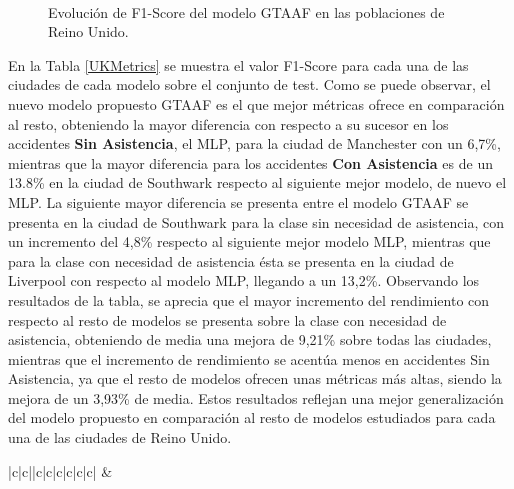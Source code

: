 \documentclass{uathesis-es}
\begin{document}
{\begin{figure}[H]
			\\
			\caption{Evolución de F1-Score del modelo GTAAF en las poblaciones de Reino Unido.}
			\label{UKLossFunction}
		\end{figure}
		
		
		En la Tabla \ref{UKMetrics} se muestra el valor F1-Score para cada una de las ciudades de cada modelo sobre el conjunto de test. Como se puede observar, el nuevo modelo propuesto GTAAF es el que mejor métricas ofrece en comparación al resto, obteniendo la mayor diferencia con respecto a su sucesor en los accidentes \textbf{Sin Asistencia}, el MLP, para la ciudad de Manchester con un 6,7\%, mientras que la mayor diferencia para los accidentes \textbf{Con Asistencia} es de un 13.8\% en la ciudad de Southwark respecto al siguiente mejor modelo, de nuevo el MLP. La siguiente mayor diferencia se presenta entre el modelo GTAAF se presenta en la ciudad de Southwark para la clase sin necesidad de asistencia, con un incremento del 4,8\% respecto al siguiente mejor modelo MLP, mientras que para la clase con necesidad de asistencia ésta se presenta en la ciudad de Liverpool con respecto al modelo MLP, llegando a un 13,2\%. Observando los resultados de la tabla, se aprecia que el mayor incremento del rendimiento con respecto al resto de modelos se presenta sobre la clase con necesidad de asistencia, obteniendo de media una mejora de 9,21\% sobre todas las ciudades, mientras que el incremento de rendimiento se acentúa menos en accidentes Sin Asistencia, ya que el resto de modelos ofrecen unas métricas más altas, siendo la mejora de un 3,93\% de media. Estos resultados reflejan una mejor generalización del modelo propuesto en comparación al resto de modelos estudiados para cada una de las ciudades de Reino Unido.
		
		\begin{table}[H]
			\begin{center}
				\begin{tabular}{|c|c||c|c|c|c|c|c|}
					\hline
					 &
					 \\ \hline
					

\end{tabular}
\end{center}
\end{table}}
\end{document}
